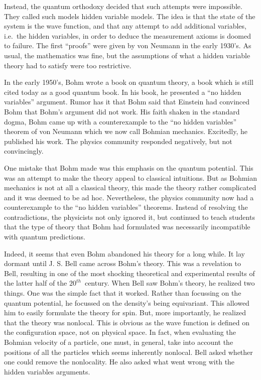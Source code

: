 \documentclass[11pt]{article}
\theoremstyle{remark}
\begin{document}
Instead, the quantum orthodoxy decided that such attempts were
impossible. They called such models hidden variable models. The idea
is that the state of the system is the wave function, and that  any
attempt to 
add additional variables, i.e.\ the hidden variables, in 
order to deduce the
measurement axioms  is doomed to failure. The first ``proofs'' were
given by von Neumann in the early 1930's. As usual, the mathematics
was fine, but the assumptions of what a hidden variable
theory had to satisfy were too restrictive. 

In the early 1950's, Bohm wrote a book on quantum theory, a book which
is still cited today as a good quantum book. In his book, he presented
a ``no hidden variables'' argument. Rumor has it that 
Bohm said that Einstein had convinced Bohm that
Bohm's argument did not work. His faith shaken in the standard dogma, 
Bohm came up with a counterexample to the ``no hidden variables''
theorem of von Neumann which we now call Bohmian mechanics. 
 Excitedly, he published his work. The physics community 
responded  negatively, but not convincingly. 


One mistake that Bohm made was this emphasis on the quantum
potential. This was an attempt to make the theory appeal to classical
intuitions. But as Bohmian mechanics is not at all a classical theory,
this made the theory rather complicated and it was deemed to be ad
hoc. Nevertheless, the physics community now had a counterexample to
the ``no hidden variables'' theorems. Instead 
of resolving the contradictions,  the physicists not only ignored
it, but continued to teach students that the type of theory that Bohm
had formulated was necessarily incompatible with quantum predictions.


Indeed, it seems that even Bohm abandoned his theory for a long while. It lay
dormant until J. S. Bell came across Bohm's theory. This was a
revelation to Bell, resulting in one of the most shocking 
theoretical and experimental results of the latter half of the \ensuremath{{20}^{th}}\
century. When Bell saw Bohm's theory, he realized two things. One was
the simple fact that it worked. Rather than focussing on the
              quantum potential,  he focussed on the density's being
equivariant. This allowed him to easily formulate the theory for
spin. 
But, more importantly, he realized that the theory was
nonlocal. This is obvious as the wave function is defined on the
configuration space, not on physical space. In fact, when evaluating 
the Bohmian velocity of a particle, one must, in general,
 take into account
 the positions of all the particles which seems inherently nonlocal. 
Bell 
asked whether one could remove the nonlocality. He also asked what
went wrong with the hidden variables arguments. 
\end{document}
